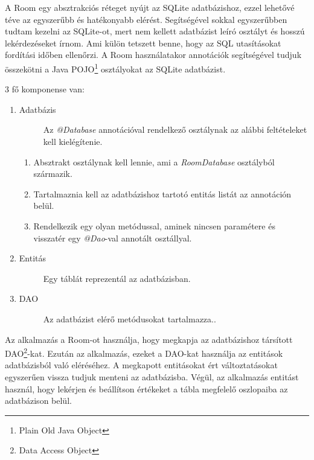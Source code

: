 \documentclass{thesis-ekf}
\theoremstyle{definition}
\theoremstyle{remark}
\begin{document}
A Room egy absztrakciós réteget nyújt az SQLite adatbázishoz, ezzel lehetővé téve az egyszerűbb és hatékonyabb elérést.
Segítségével sokkal egyszerűbben tudtam kezelni az SQLite-ot, mert nem kellett adatbázist leíró osztályt és hosszú lekérdezéseket írnom.
Ami külön tetszett benne, hogy az SQL utasításokat fordítási időben ellenőrzi. 
A Room használatakor annotációk segítségével tudjuk összekötni a Java POJO\footnote{Plain Old Java Object} osztályokat az SQLite adatbázist.

3 fő komponense van:

\begin{enumerate}
	\item
	\begin{description}
		\item[Adatbázis] Az \emph{@Database} annotációval rendelkező osztálynak az alábbi feltételeket kell kielégítenie.
	\end{description}
	\begin{enumerate}
		\item Absztrakt osztálynak kell lennie, ami a \emph{RoomDatabase} osztályból származik.
		\item Tartalmaznia kell az adatbázishoz tartotó entitás listát az annotáción belül.
		\item Rendelkezik egy olyan metódussal, aminek nincsen paramétere és visszatér egy \emph{@Dao}-val annotált osztállyal.
	\end{enumerate}
	\item
	\begin{description}
		\item[Entitás] Egy táblát reprezentál az adatbázisban.
	\end{description}
	\item
	\begin{description}
		\item[DAO] Az adatbázist elérő metódusokat tartalmazza..
	\end{description}
\end{enumerate}

Az alkalmazás a Room-ot használja, hogy megkapja az adatbázishoz társított DAO\footnote{Data Access Object}-kat.
Ezután az alkalmazás, ezeket a DAO-kat használja az entitások adatbázisból való eléréséhez.
A megkapott entitásokat ért változtatásokat egyszerűen vissza tudjuk menteni az adatbázisba.
Végül, az alkalmazás entitást használ, hogy lekérjen és beállítson értékeket a tábla megfelelő oszlopaiba az adatbázison belül.\cite{room}
\end{document}
